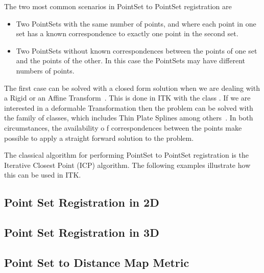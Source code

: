 The two most common scenarios in PointSet to PointSet registration are

\begin{itemize}
\item Two PointSets with the same number of points, and where each point in one
set has a known correspondence to exactly one point in the second set.
\item Two PointSets without known correspondences between the points of one set
and the points of the other. In this case the PointSets may have different
numbers of points.
\end{itemize}

The first case can be solved with a closed form solution when we are dealing
with a Rigid or an Affine Transform~\cite{Horn1987}. This is done in ITK with
the class . If we are interested in
a deformable Transformation then the problem can be solved with the
 family of classes, which includes Thin Plate Splines
among others~\cite{Rohr2001}. In both circumstances, the availability o f
correspondences between the points make possible to apply a straight forward
solution to the problem.


The classical algorithm for performing PointSet to PointSet registration is the
Iterative Closest Point (ICP) algorithm.  The following examples illustrate how
this can be used in ITK.



\subsection{Point Set Registration in 2D}
\label{sec:PointSetRegistrationIn2D}

\ifitkFullVersion

\fi




\subsection{Point Set Registration in 3D}
\label{sec:PointSetRegistrationIn3D}

\ifitkFullVersion

\fi



\subsection{Point Set to Distance Map Metric}
\label{sec:PointSetToDistanceMapMetric}

\ifitkFullVersion

\fi


